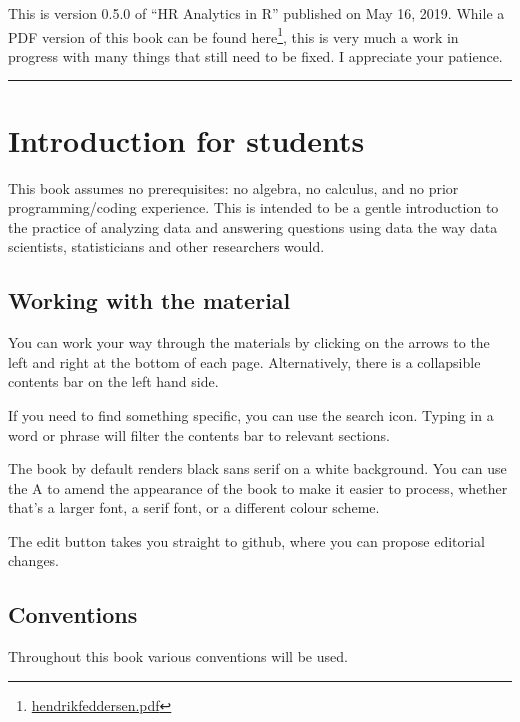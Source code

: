 \documentclass[
  12pt, krantz2,
]{krantz}
\renewcommand{\href}[2]{#2\footnote{\url{#1}}}
\begin{document}
This is version 0.5.0 of ``HR Analytics in R'' published on May 16, 2019. While a PDF version of this book can be found \href{hendrikfeddersen.pdf}{here}, this is very much a work in progress with many things that still need to be fixed. I appreciate your patience.

\begin{center}\rule{0.5\linewidth}{\linethickness}\end{center}

\hypertarget{sec:intro-for-students}{%
\section{Introduction for students}\label{sec:intro-for-students}}

This book assumes no prerequisites: no algebra, no calculus, and no prior programming/coding experience. This is intended to be a gentle introduction to the practice of analyzing data and answering questions using data the way data scientists, statisticians and other researchers would.

\hypertarget{workingwithmaterials}{%
\subsection*{Working with the material}\label{workingwithmaterials}}


You can work your way through the materials by clicking on the arrows to the left and right at the bottom of each page. Alternatively, there is a collapsible contents bar on the left hand side.

If you need to find something specific, you can use the search icon. Typing in a word or phrase will filter the contents bar to relevant sections.

The book by default renders black sans serif on a white background. You can use the A to amend the appearance of the book to make it easier to process, whether that's a larger font, a serif font, or a different colour scheme.

The edit button takes you straight to github, where you can propose editorial changes.

\hypertarget{conventions}{%
\subsection*{Conventions}\label{conventions}}


Throughout this book various conventions will be used.
\end{document}
